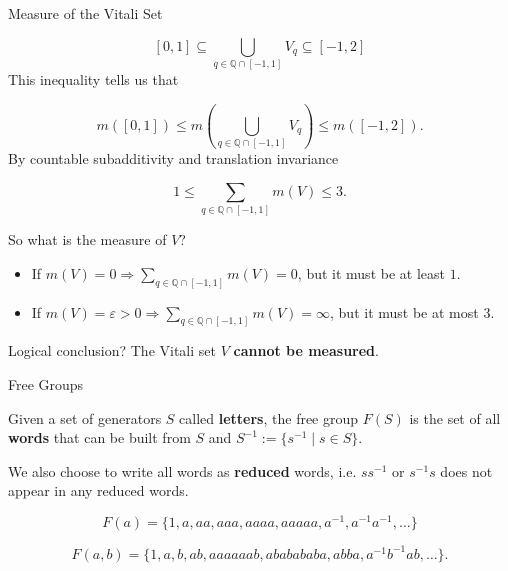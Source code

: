 \documentclass[9pt]{beamer}
\begin{document}
    \begin{frame}{Measure of the Vitali Set}

        \[[0, 1]\subseteq\bigcup_{q\in\mathbb{Q}\cap[-1, 1]} V_q\subseteq[-1, 2]\]\pause
        This inequality tells us that

        \[m([0, 1])\leq m\left(\bigcup_{q\in\mathbb{Q}\cap[-1, 1]} V_q\right)\leq m([-1, 2]).\]\pause
        By countable subadditivity and translation invariance

        \[1\leq \sum_{q\in\mathbb{Q}\cap[-1, 1]} m(V)\leq 3.\]\pause

        So what is the measure of $V$?\pause

        \begin{itemize}
            \item If $m(V)=0\Rightarrow\sum_{q\in\mathbb{Q}\cap[-1, 1]} m(V)=0$, but it must be at least $1$. \pause
            \item If $m(V)=\varepsilon>0\Rightarrow\sum_{q\in\mathbb{Q}\cap[-1, 1]} m(V)=\infty$, but it must be at most $3$.
        \end{itemize}

        \pause

        \vspace{24pt}

        Logical conclusion?
        The Vitali set $V$ \textbf{cannot be measured}.
        
    \end{frame}

    \begin{frame}{Free Groups}

        Given a set of generators $S$ called \textbf{letters}, the free group $F(S)$ is the set of all \textbf{words} that can be built from $S$ and $S^{-1}:=\{s^{-1}\;|\;s\in S\}$.

        \pause

        \vspace{24pt}
        
        We also choose to write all words as \textbf{reduced} words, i.e. $ss^{-1}$ or $s^{-1}s$ does not appear in any reduced words.

        \[F(a)=\{1, a, aa, aaa, aaaa, aaaaa, a^{-1}, a^{-1} a^{-1}, \dots\}\]\pause

        \[F(a, b)=\{1, a, b, ab, aaaaaab, ababababa, abba, a^{-1} b^{-1} ab, \dots\}.\]
        
    \end{frame}
\end{document}
